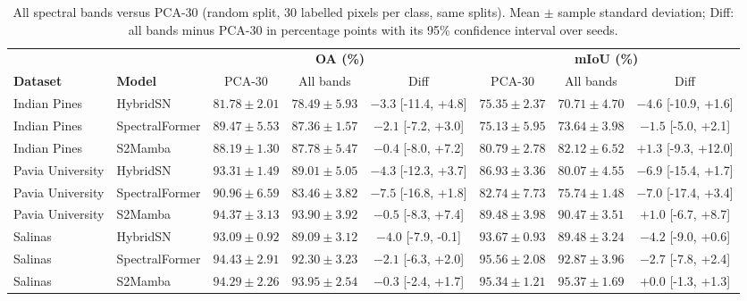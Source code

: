\begin{table}[!t]
\centering
\caption{All spectral bands versus PCA-30 (random split, 30 labelled pixels per class, same splits). Mean $\pm$ sample standard deviation; Diff: all bands minus PCA-30 in percentage points with its 95\% confidence interval over seeds.}
\label{tab:fullband}
\scriptsize
\setlength{\tabcolsep}{3pt}
\begin{tabular}{llcccccc}
\toprule
 & & \multicolumn{3}{c}{\textbf{OA (\%)}} & \multicolumn{3}{c}{\textbf{mIoU (\%)}} \\
\cmidrule(lr){3-5}\cmidrule(lr){6-8}
\textbf{Dataset} & \textbf{Model} & PCA-30 & All bands & Diff & PCA-30 & All bands & Diff \\
\midrule
Indian Pines & HybridSN & $81.78 \pm 2.01$ & $78.49 \pm 5.93$ & $-3.3$ [-11.4, +4.8] & $75.35 \pm 2.37$ & $70.71 \pm 4.70$ & $-4.6$ [-10.9, +1.6] \\
Indian Pines & SpectralFormer & $89.47 \pm 5.53$ & $87.36 \pm 1.57$ & $-2.1$ [-7.2, +3.0] & $75.13 \pm 5.95$ & $73.64 \pm 3.98$ & $-1.5$ [-5.0, +2.1] \\
Indian Pines & S2Mamba & $88.19 \pm 1.30$ & $87.78 \pm 5.47$ & $-0.4$ [-8.0, +7.2] & $80.79 \pm 2.78$ & $82.12 \pm 6.52$ & $+1.3$ [-9.3, +12.0] \\
Pavia University & HybridSN & $93.31 \pm 1.49$ & $89.01 \pm 5.05$ & $-4.3$ [-12.3, +3.7] & $86.93 \pm 3.36$ & $80.07 \pm 4.55$ & $-6.9$ [-15.4, +1.7] \\
Pavia University & SpectralFormer & $90.96 \pm 6.59$ & $83.46 \pm 3.82$ & $-7.5$ [-16.8, +1.8] & $82.74 \pm 7.73$ & $75.74 \pm 1.48$ & $-7.0$ [-17.4, +3.4] \\
Pavia University & S2Mamba & $94.37 \pm 3.13$ & $93.90 \pm 3.92$ & $-0.5$ [-8.3, +7.4] & $89.48 \pm 3.98$ & $90.47 \pm 3.51$ & $+1.0$ [-6.7, +8.7] \\
Salinas & HybridSN & $93.09 \pm 0.92$ & $89.09 \pm 3.12$ & $-4.0$ [-7.9, -0.1] & $93.67 \pm 0.93$ & $89.48 \pm 3.24$ & $-4.2$ [-9.0, +0.6] \\
Salinas & SpectralFormer & $94.43 \pm 2.91$ & $92.30 \pm 3.23$ & $-2.1$ [-6.3, +2.0] & $95.56 \pm 2.08$ & $92.87 \pm 3.96$ & $-2.7$ [-7.8, +2.4] \\
Salinas & S2Mamba & $94.29 \pm 2.26$ & $93.95 \pm 2.54$ & $-0.3$ [-2.4, +1.7] & $95.34 \pm 1.21$ & $95.37 \pm 1.69$ & $+0.0$ [-1.3, +1.3] \\
\bottomrule
\end{tabular}
\end{table}
